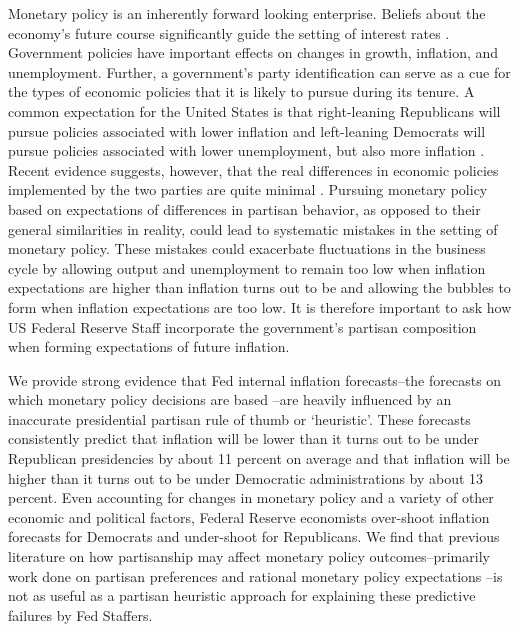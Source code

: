 \documentclass[a4paper]{article}\usepackage[]{graphicx}\usepackage[]{color}
\begin{document}
Monetary policy is an inherently forward looking enterprise. Beliefs about the economy's future course significantly guide the setting of interest rates \citep[59]{Goodhart2001}. Government policies have important effects on changes in growth, inflation, and unemployment. Further, a government's party identification can serve as a cue for the types of economic policies that it is likely to pursue during its tenure. A common expectation for the United States is that right-leaning Republicans will pursue policies associated with lower inflation and left-leaning Democrats will pursue policies associated with lower unemployment, but also more inflation \cite[see][]{Samuelson1977,HibbsJr1977}. Recent evidence suggests, however, that the real differences in economic policies implemented by the two parties are quite minimal \citep{Bartels2008}. Pursuing monetary policy based on expectations of differences in partisan behavior, as opposed to their general similarities in reality, could lead to systematic mistakes in the setting of monetary policy. These mistakes could exacerbate fluctuations in the business cycle by allowing output and unemployment to remain too low when inflation expectations are higher than inflation turns out to be and allowing the bubbles to form when inflation expectations are too low. It is therefore important to ask how US Federal Reserve Staff incorporate the government's partisan composition when forming expectations of future inflation.

We provide strong evidence that Fed internal inflation forecasts--the forecasts on which monetary policy decisions are based \citep[130]{Adolph2013}--are heavily influenced by an inaccurate presidential partisan rule of thumb or `heuristic'. These forecasts consistently predict that inflation will be lower than it turns out to be under Republican presidencies by about 11 percent on average and that inflation will be higher than it turns out to be under Democratic administrations by about 13 percent. Even accounting for changes in monetary policy and a variety of other economic and political factors, Federal Reserve economists over-shoot inflation forecasts for Democrats and under-shoot for Republicans. We find that previous literature on how partisanship may affect monetary policy outcomes--primarily work done on partisan preferences \citep{Clark2012,Hakes1988,Sieg1997,Tootell1996} and rational monetary policy expectations \citep{Alesina1987,Alesina1991,Hibbs1994}--is not as useful as a partisan heuristic approach for explaining these predictive failures by Fed Staffers.
\end{document}
